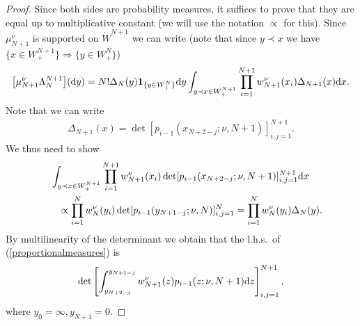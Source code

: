 \documentclass[pdftex]{sigma}
\numberwithin{equation}{section}
\begin{document}
\begin{proof}Since both sides are probability measures, it suffices to prove that they are equal up to multiplicative constant (we will use the notation $\propto$ for this). Since $\mu_{N+1}^{\nu}$ is supported on $\mathring{W}^{N+1}$ we can write (note that since $y\prec x$ we have $\big\{x \in W^{N+1}_+\big\} \Rightarrow \big\{y \in W^{N}_+\big\}$)
\begin{gather*}
\big[\mu_{N+1}^{\nu}\Lambda_N^{N+1}\big]({\rm d}y)=N! \Delta_N(y)\mathbf{1}_{\{y \in W_+^N \}}{\rm d}y \int_{y\prec x \in W^{N+1}_+}^{}\prod_{i=1}^{N+1}w_{N+1}^{\nu}(x_i) \Delta_{N+1}(x){\rm d}x.
\end{gather*}
Note that we can write
\begin{gather*}
\Delta_{N+1}(x)=\det [p_{i-1} (x_{N+2-j};\nu,N+1 ) ]^{N+1}_{i,j=1}.
\end{gather*}
We thus need to show
\begin{gather}
\int_{y\prec x \in W^{N+1}_+}^{}\prod_{i=1}^{N+1}w_{N+1}^{\nu}(x_i) \det [p_{i-1} (x_{N+2-j};\nu,N+1 ) ]^{N+1}_{i,j=1}{\rm d}x\nonumber\\
\qquad {}\propto \prod_{i=1}^{N}w_N^{\nu}(y_i)\det [p_{i-1} (y_{N+1-j};\nu,N ) ]^{N}_{i,j=1}
 =\prod_{i=1}^{N}w_N^{\nu}(y_i)\Delta_N(y) .\label{proportionalmeasures}
\end{gather}
By multilinearity of the determinant we obtain that the l.h.s.\ of (\ref{proportionalmeasures}) is
\begin{gather*}
\det\left[\int_{y_{N+2-j}}^{y_{N+1-j}}w_{N+1}^{\nu}(z)p_{i-1} (z;\nu,N+1 ){\rm d}z\right]^{N+1}_{i,j=1},
\end{gather*}
where $y_0=\infty, y_{N+1}=0$.


\end{proof}
\end{document}
